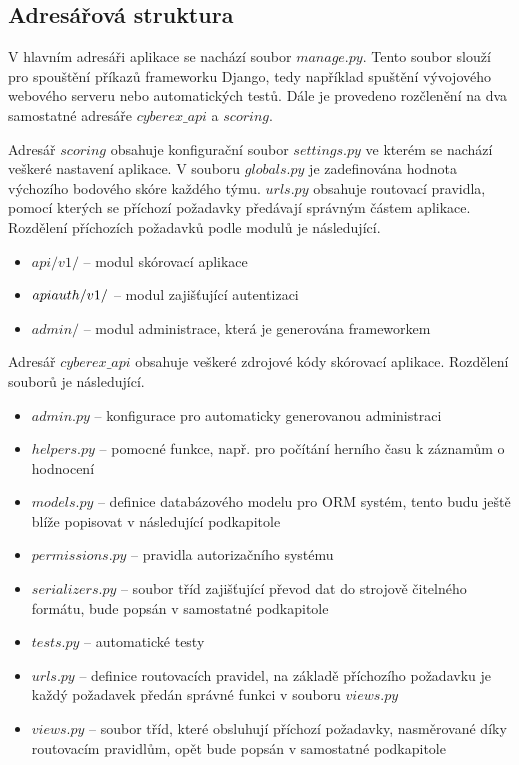 \documentclass[
  digital, %
  twoside, %
  table,   %
  lof,     %
  lot,     %
]{fithesis3}
\begin{document}
\subsection{Adresářová struktura}
V hlavním adresáři aplikace se nachází soubor $manage.py$. Tento soubor slouží pro spouštění příkazů frameworku Django, tedy například spuštění vývojového webového serveru nebo automatických testů. Dále je provedeno rozčlenění na dva samostatné adresáře $cyberex\_api$ a $scoring$.

Adresář $scoring$ obsahuje konfigurační soubor $settings.py$ ve kterém se nachází veškeré nastavení aplikace. V souboru $globals.py$ je zadefinována hodnota výchozího bodového skóre každého týmu. $urls.py$ obsahuje routovací pravidla, pomocí kterých se příchozí požadavky předávají správným částem aplikace. Rozdělení příchozích požadavků podle modulů je následující.

\begin{itemize}
    \item $api/v1/$ -- modul skórovací aplikace
    \item $api\-auth/v1/$ -- modul zajišťující autentizaci
    \item $admin/$ -- modul administrace, která je generována frameworkem
\end{itemize}

Adresář $cyberex\_api$ obsahuje veškeré zdrojové kódy skórovací aplikace. Rozdělení souborů je následující.

\begin{itemize}
    \item $admin.py$ -- konfigurace pro automaticky generovanou administraci
    \item $helpers.py$ -- pomocné funkce, např. pro počítání herního času k záznamům o hodnocení
    \item $models.py$ -- definice databázového modelu pro ORM systém, tento budu ještě blíže popisovat v následující podkapitole
    \item $permissions.py$ -- pravidla autorizačního systému
    \item $serializers.py$ -- soubor tříd zajišťující převod dat do strojově čitelného formátu, bude popsán v samostatné podkapitole
    \item $tests.py$ -- automatické testy
    \item $urls.py$ -- definice routovacích pravidel, na základě příchozího požadavku je každý požadavek předán správné funkci v souboru $views.py$
    \item $views.py$ -- soubor tříd, které obsluhují příchozí požadavky, nasměrované díky routovacím pravidlům, opět bude popsán v samostatné podkapitole
\end{itemize}
\end{document}
